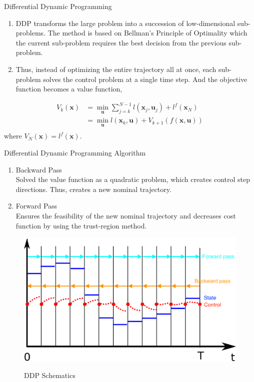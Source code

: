 \documentclass[10pt,compress]{beamer}
\begin{document}
\begin{frame}{Differential Dynamic Programming}
\begin{enumerate}
\item DDP transforms the large problem into a succession of low-dimensional sub-problems. The method is based on Bellman's Principle of Optimality which the current sub-problem requires the best decision from the previous sub-problem. 
\item Thus, instead of optimizing the entire trajectory all at once, each sub-problem solves the control problem at a single time step. And the objective function becomes a value function, 
\end{enumerate}

\begin{align*}
    V_k(\textbf{x}) & = \min_{\textbf{u}} \sum^{N-1}_{j=k} l(\textbf{x}_j, \textbf{u}_j) + l^f(\textbf{x}_N) \\
    & = \min_{\textbf{u}} l(\textbf{x}_k, \textbf{u}) + V_{k+1}(f(\textbf{x}, \textbf{u})) \\
\end{align*}
\hspace{3.2 cm} where $V_N(\textbf{x}) = l^f(\textbf{x})$. 

\end{frame}

\begin{frame}{Differential Dynamic Programming Algorithm}
    \begin{enumerate}
        \item Backward Pass \\
        Solved the value function as a quadratic problem, which creates control step directions. Thus, creates a new nominal trajectory. 
        \item Forward Pass \\
        Ensures the feasibility of the new nominal trajectory and decreases cost function by using the trust-region method. 
    \end{enumerate}

    \begin{figure}
        \centering
        \includegraphics[width=8 cm]{images/xu_gap_ddp.png}
        \label{fig:ddp-schematics}
        \caption{DDP Schematics}
    \end{figure}
\end{frame}
\end{document}
